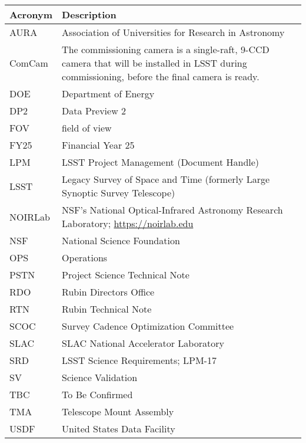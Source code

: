 \addtocounter{table}{-1}
\begin{longtable}{p{}p{}}\hline
\textbf{Acronym} & \textbf{Description}  \\\hline

AURA & Association of Universities for Research in Astronomy \\\hline
ComCam & The commissioning camera is a single-raft, 9-CCD camera that will be installed in LSST during commissioning, before the final camera is ready. \\\hline
DOE & Department of Energy \\\hline
DP2 & Data Preview 2 \\\hline
FOV & field of view \\\hline
FY25 & Financial Year 25 \\\hline
LPM & LSST Project Management (Document Handle) \\\hline
LSST & Legacy Survey of Space and Time (formerly Large Synoptic Survey Telescope) \\\hline
NOIRLab & NSF's National Optical-Infrared Astronomy Research Laboratory; \url{https://noirlab.edu} \\\hline
NSF & National Science Foundation \\\hline
OPS & Operations \\\hline
PSTN & Project Science Technical Note \\\hline
RDO & Rubin Directors Office \\\hline
RTN & Rubin Technical Note \\\hline
SCOC & Survey Cadence Optimization Committee \\\hline
SLAC & SLAC National Accelerator Laboratory \\\hline
SRD & LSST Science Requirements; LPM-17 \\\hline
SV & Science Validation \\\hline
TBC & To Be Confirmed \\\hline
TMA & Telescope Mount Assembly \\\hline
USDF & United States Data Facility \\\hline
\end{longtable}
